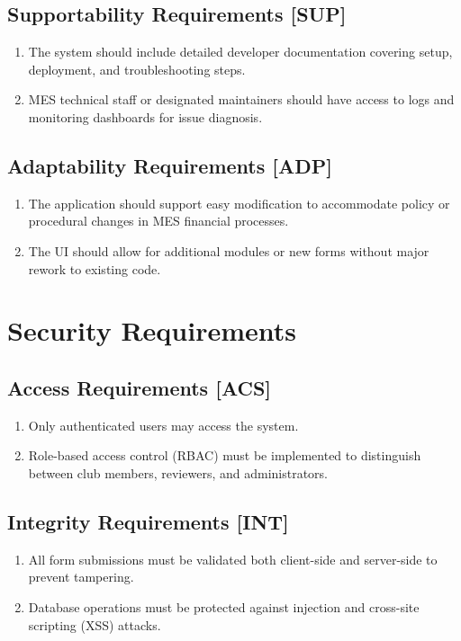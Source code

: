 \documentclass[12pt]{article}
\begin{document}
\subsection{Supportability Requirements [SUP]}
\begin{enumerate}
    \item The system should include detailed developer documentation covering setup, deployment, and troubleshooting steps.
    \item MES technical staff or designated maintainers should have access to logs and monitoring dashboards for issue diagnosis.
\end{enumerate}

\subsection{Adaptability Requirements [ADP]}
\begin{enumerate}
    \item The application should support easy modification to accommodate policy or procedural changes in MES financial processes.
    \item The UI should allow for additional modules or new forms without major rework to existing code.
\end{enumerate}

\section{Security Requirements}

\subsection{Access Requirements [ACS]}
\begin{enumerate}
    \item Only authenticated users may access the system.
    \item Role-based access control (RBAC) must be implemented to distinguish between club members, reviewers, and administrators.
\end{enumerate}

\subsection{Integrity Requirements [INT]}
\begin{enumerate}
    \item All form submissions must be validated both client-side and server-side to prevent tampering.
    \item Database operations must be protected against injection and cross-site scripting (XSS) attacks.
\end{enumerate}
\end{document}

